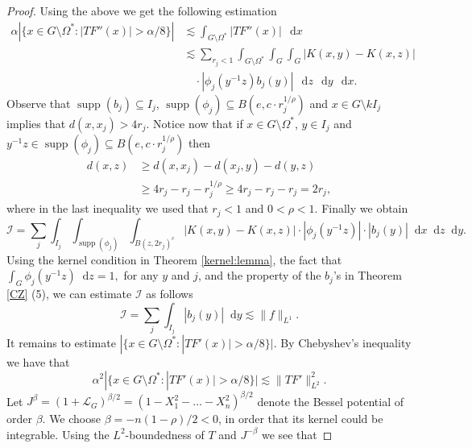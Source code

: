 \documentclass[12pt, reqno]{amsart}
\theoremstyle{definition}
\theoremstyle{remark}
\numberwithin{equation}{section}
\newcommand*\diff{\mathop{}\!\mathrm{d}}
\begin{document}
\begin{proof}
    Using the above we get the following estimation
\begin{equation*}
\begin{aligned}
    \alpha \left|\{x \in G \setminus\Omega^* : |TF''(x)| > \alpha/8\}\right| 
    &\lesssim \int_{G \setminus\Omega^*} |TF''(x)| \, \diff{x} \\
    &\lesssim \sum_{r_j < 1} \int_{G \setminus\Omega^*} \int_{G} \int_{G} \Big| K(x,y) - K(x,z) \Big| \\
    &\quad \cdot |\phi_j(y^{-1}z) b_j(y) |\, \diff{z} \, \diff{y} \, \diff{x}.
\end{aligned}
\end{equation*}
Observe that $\operatorname{supp}(b_j)\subseteq I_j$, $\operatorname{supp}(\phi_j)\subseteq B(e,c\cdot r_j^{1/\rho})$ and $x\in G\setminus kI_j$ implies that $d(x,x_j)>4r_j$. Notice now that if $x\in G\setminus\Omega^*$, $y\in I_j$ and $y^{-1}z\in\operatorname{supp}(\phi_j)\subseteq B(e,c\cdot r_j^{1/\rho})$ then
\begin{equation*}
\begin{aligned}
    d(x,z)&\geq d(x,x_j)-d(x_j,y)-d(y,z)\\
    &\geq 4r_j-r_j-r_j^{1/\rho}\geq 4r_j-r_j-r_j=2r_j,
\end{aligned}
\end{equation*}
where in the last inequality we used that $r_j<1$ and $0<\rho<1$. Finally we obtain
\begin{equation*}
    \mathscr{I}=\sum_{j}\int_{I_j}\int_{\operatorname{supp}(\phi_j)}\int_{B(z,2r_j)^c}|K(x,y)-K(x,z)|\cdot|\phi_j(y^{-1}z)|\cdot|b_j(y)|\diff{x}\diff{z}\diff{y}.
\end{equation*}
Using the kernel condition in Theorem \ref{kernel:lemma}, the fact that $\int_{G}\phi_j(y^{-1}z)\diff{z}=1,$ for any $y$ and $j$, and the property of the $b_j$'s in Theorem \ref{CZ} (5), we can estimate $\mathscr{I}$ as follows
\begin{equation*}
     \mathscr{I}= \sum_{j}\int_{I_j}|b_j(y)|\diff{y}\lesssim\|f\|_{L^1}.
\end{equation*}
It remains to estimate $|\{x\in G\setminus\Omega^*:|TF'(x)|>\alpha/8\}|$. By Chebyshev's inequality we have that 
\begin{equation*}
    \alpha^2|\{x\in G\setminus\Omega^*:|TF'(x)|>\alpha/8\}|\lesssim\|TF'\|^{2}_{L^2}.
\end{equation*}
Let $J^\beta=(1+\mathcal{L}_{G})^{\beta/2}=(1-X_1^2-\dots-X_n^2)^{\beta/2}$ denote the Bessel potential of order $\beta$. We choose $\beta=-n(1-\rho)/2<0$, in order that its kernel could be integrable. Using the $L^2$-boundedness of $T$ and $J^{-\beta}$ we see that

\end{proof}
\end{document}
